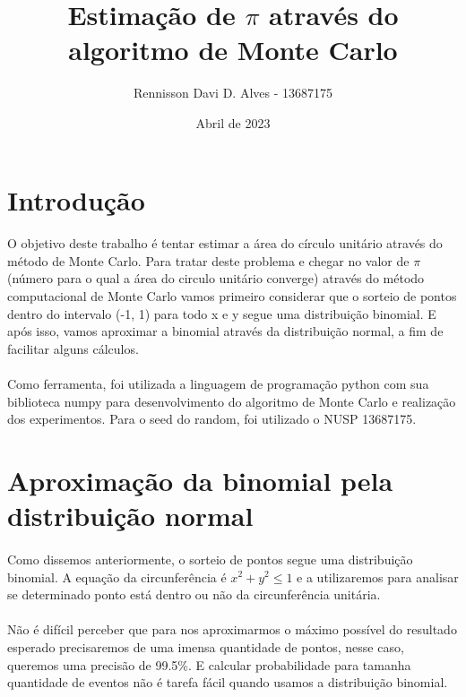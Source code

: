 \documentclass{article}
\title{Estimação de $\pi$ através do algoritmo de Monte Carlo}
\author{Rennisson Davi D. Alves - 13687175}
\date{Abril de 2023}
\begin{document}
\maketitle

    \section{Introdução}
    \paragraph{} O objetivo deste trabalho é tentar estimar a área do círculo unitário através do método de Monte Carlo. Para tratar deste problema e chegar no valor de $\pi$ (número para o qual a área do circulo unitário converge) através do método computacional de Monte Carlo vamos primeiro considerar que o sorteio de pontos dentro do intervalo (-1, 1) para todo x e y segue uma distribuição binomial. E após isso, vamos aproximar a binomial através da distribuição normal, a fim de facilitar alguns cálculos.
    \paragraph{} Como ferramenta, foi utilizada a linguagem de programação python com sua biblioteca numpy para desenvolvimento do algoritmo de Monte Carlo e realização dos experimentos. Para o seed do random, foi utilizado o NUSP 13687175. 
    
    \section{Aproximação da binomial pela distribuição normal}
    
    \paragraph{} Como dissemos anteriormente, o sorteio de pontos segue uma distribuição binomial. A equação da circunferência é $x^2 + y^2 \le 1$ e a utilizaremos para analisar se determinado ponto está dentro ou não da circunferência unitária.

    \paragraph{} Não é difícil perceber que para nos aproximarmos o máximo possível do resultado esperado precisaremos de uma imensa quantidade de pontos, nesse caso, queremos uma precisão de 99.5\%. E calcular probabilidade para tamanha quantidade de eventos não é tarefa fácil quando usamos a distribuição binomial.
\end{document}
